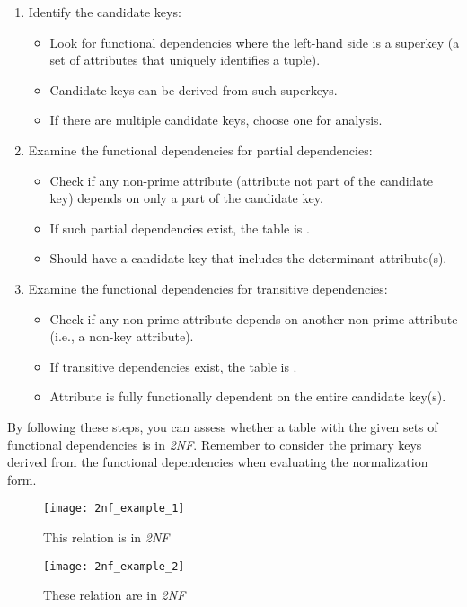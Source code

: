 \begin{enumerate}
    \item Identify the candidate keys:
    \begin{itemize}
        \item Look for functional dependencies where the left-hand side is a superkey (a set of attributes that uniquely identifies a tuple).
        \item Candidate keys can be derived from such superkeys.
        \item If there are multiple candidate keys, choose one for analysis.
    \end{itemize}
    \item Examine the functional dependencies for partial dependencies:
    \begin{itemize}
        \item Check if any non-prime attribute (attribute not part of the candidate key) depends on only a part of the candidate key.
        \item If such partial dependencies exist, the table is .
        \item Should have a candidate key that includes the determinant attribute(s).
    \end{itemize}
    \item Examine the functional dependencies for transitive dependencies:
    \begin{itemize}
        \item Check if any non-prime attribute depends on another non-prime attribute (i.e., a non-key attribute).
        \item If transitive dependencies exist, the table is .
        \item Attribute is fully functionally dependent on the entire candidate key(s).
    \end{itemize}
\end{enumerate}

By following these steps, you can assess whether a table with the given sets of functional dependencies is in \textit{2NF}. Remember to consider the primary keys derived from the functional dependencies when evaluating the normalization form.

\begin{minipage}[b]{0.48\textwidth}
\begin{figure}[H]
    \centering
    \texttt{[image: 2nf\_example\_1]}
    \caption{This relation is  in \textit{2NF}}
\end{figure}
\end{minipage}
\hfill
\begin{minipage}[b]{0.48\textwidth}
\begin{figure}[H]
    \centering
    \texttt{[image: 2nf\_example\_2]}
    \caption{These relation are in \textit{2NF}}
\end{figure}
\end{minipage}

